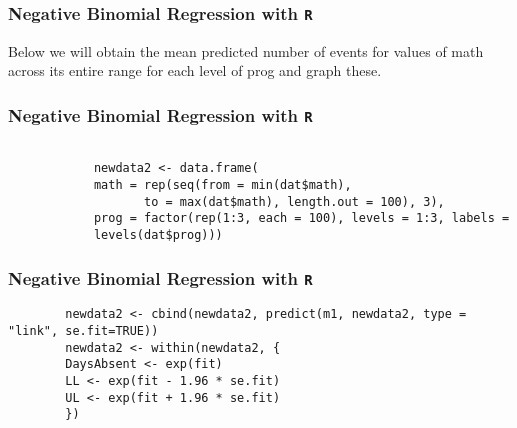 \documentclass[MASTER.tex]{subfiles}
\begin{document}
	\begin{frame}[fragile]
		\frametitle{Negative Binomial Regression with \texttt{R} }
		\Large	
	Below we will obtain the mean predicted number of events for values of math across its entire range for each level of prog and graph these.
	\end{frame}

		\begin{frame}[fragile]
		\frametitle{Negative Binomial Regression with \texttt{R} }
		\large
		
		\begin{framed}
		\begin{verbatim}
		
			newdata2 <- data.frame(
			math = rep(seq(from = min(dat$math), 
			       to = max(dat$math), length.out = 100), 3),
			prog = factor(rep(1:3, each = 100), levels = 1:3, labels =
			levels(dat$prog)))
		\end{verbatim}	
		\end{framed}
		
		
		\end{frame}
	\begin{frame}[fragile]
	\frametitle{Negative Binomial Regression with \texttt{R} }
	\large
	
	\begin{verbatim}
		newdata2 <- cbind(newdata2, predict(m1, newdata2, type = "link", se.fit=TRUE))
		newdata2 <- within(newdata2, {
		DaysAbsent <- exp(fit)
		LL <- exp(fit - 1.96 * se.fit)
		UL <- exp(fit + 1.96 * se.fit)
		})
	\end{verbatim}

\end{frame}
\end{document}
